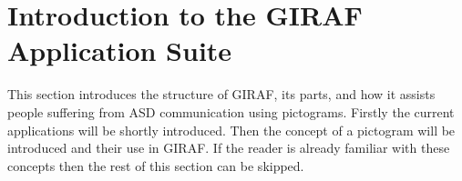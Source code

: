 \section{Introduction to the GIRAF Application Suite}\label{sec:giraf-intro}
This section introduces the structure of GIRAF, its parts, and how it assists people suffering from ASD communication using pictograms.
Firstly the current applications will be shortly introduced.
Then the concept of a pictogram will be introduced and their use in GIRAF.
If the reader is already familiar with these concepts then the rest of this section can be skipped.



